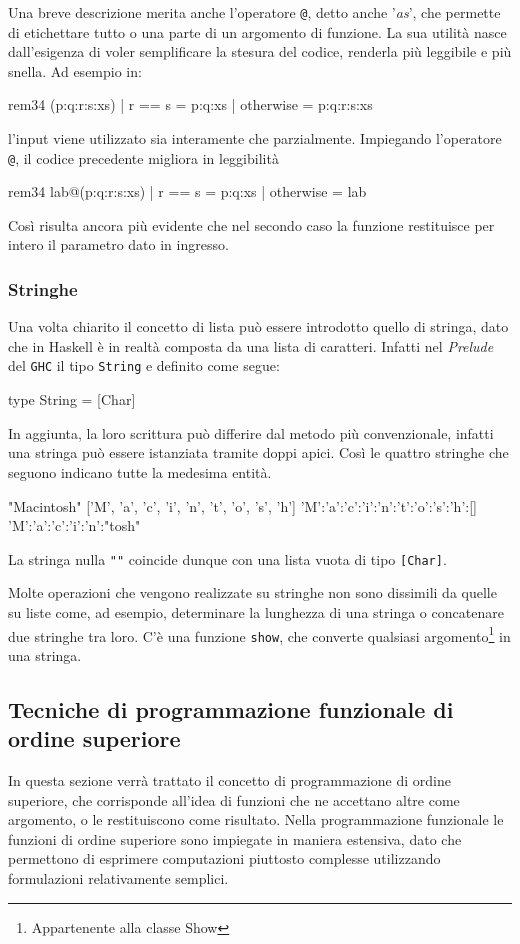 Una breve descrizione merita anche l'operatore \verb"@", detto anche 
'\emph{as}', che permette di etichettare tutto o una parte di un 
argomento di funzione. La sua utilit\`a nasce dall'esigenza di 
voler semplificare la stesura del codice, renderla pi\`{u} leggibile e pi\`u 
snella. Ad esempio in:
\begin{haskellCode}
rem34 (p:q:r:s:xs) | r == s     =  p:q:xs
                   | otherwise  =  p:q:r:s:xs
\end{haskellCode}
l'input viene utilizzato sia interamente che parzialmente. Impiegando 
l'operatore \verb"@", il codice precedente migliora in leggibilit\`a
\begin{haskellCode}
rem34 lab@(p:q:r:s:xs) | r == s     =  p:q:xs
                       | otherwise  =  lab
\end{haskellCode}
Cos\`i risulta ancora pi\`u evidente che nel secondo caso la funzione 
restituisce per intero il parametro dato in ingresso.

\subsubsection{Stringhe}
Una volta chiarito il concetto di lista pu\`o essere introdotto quello di stringa, 
dato che in Haskell \`e in realt\`a composta da una lista di caratteri. 
Infatti nel \emph{Prelude} del \verb"GHC"
il tipo \verb"String" e definito come segue:
\begin{haskellCode}
type String = [Char]
\end{haskellCode}
In aggiunta, la loro scrittura pu\`{o} differire dal metodo pi\`{u} convenzionale, infatti una stringa pu\`{o} essere
istanziata tramite doppi apici.
Cos\`i le quattro stringhe che seguono 
indicano tutte la medesima entit\`a.
\begin{haskellCode}
"Macintosh"
['M', 'a', 'c', 'i', 'n', 't', 'o', 's', 'h']
'M':'a':'c':'i':'n':'t':'o':'s':'h':[]
'M':'a':'c':'i':'n':"tosh"
\end{haskellCode}
La stringa nulla \verb+""+ coincide dunque con una lista vuota di tipo 
\verb"[Char]". 

Molte operazioni che vengono realizzate su stringhe non 
sono dissimili da quelle su liste come, ad esempio, determinare la lunghezza di una 
stringa o concatenare due stringhe tra loro. C'\`e una funzione 
\verb"show", che converte qualsiasi argomento\footnote{Appartenente alla classe Show} in una stringa.

\subsection{Tecniche di programmazione funzionale di ordine 
superiore}
In questa sezione verr\`{a} trattato il concetto di programmazione di ordine 
superiore, che corrisponde all'idea di funzioni che ne accettano altre 
come argomento, o le restituiscono come risultato. Nella 
programmazione funzionale le funzioni di ordine superiore sono impiegate 
in maniera estensiva, dato che permettono di esprimere computazioni 
piuttosto complesse utilizzando formulazioni relativamente semplici.

